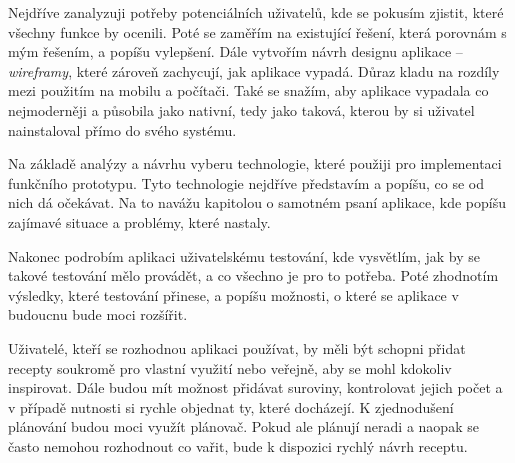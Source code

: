 Nejdříve zanalyzuji potřeby potenciálních uživatelů, kde se pokusím zjistit, které všechny funkce by ocenili. Poté se
zaměřím na existující řešení, která porovnám s mým řešením, a popíšu vylepšení. Dále vytvořím návrh designu aplikace -- \emph{wireframy},
které zároveň zachycují, jak aplikace vypadá. Důraz kladu na rozdíly mezi použitím na mobilu a počítači. Také se snažím, aby
aplikace vypadala co nejmoderněji a působila jako nativní, tedy jako taková, kterou by si uživatel nainstaloval přímo do svého systému.

Na základě analýzy a návrhu vyberu technologie, které použiji pro implementaci funkčního prototypu. Tyto technologie nejdříve představím
a popíšu, co se od nich dá očekávat. Na to navážu kapitolou o samotném psaní aplikace, kde popíšu zajímavé situace a problémy, které nastaly.

Nakonec podrobím aplikaci uživatelskému testování, kde vysvětlím, jak by se takové testování mělo provádět, a co všechno je pro to potřeba.
Poté zhodnotím výsledky, které testování přinese, a popíšu možnosti, o které se aplikace v budoucnu bude moci rozšířit.

Uživatelé, kteří se rozhodnou aplikaci používat, by měli být schopni přidat recepty soukromě pro vlastní využití nebo veřejně,
aby se mohl kdokoliv inspirovat. Dále budou mít možnost přidávat suroviny, kontrolovat jejich počet a v případě nutnosti si
rychle objednat ty, které docházejí. K zjednodušení plánování budou moci využít plánovač. Pokud ale plánují neradi a naopak
se často nemohou rozhodnout co vařit, bude k dispozici rychlý návrh receptu.
